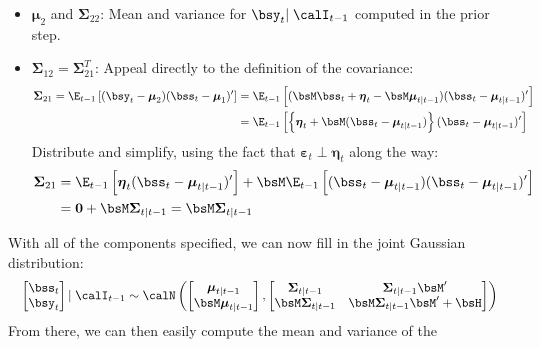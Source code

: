 \documentclass[12pt]{article}
\theoremstyle{plain}
\theoremstyle{definition}
\theoremstyle{remark}
\newcommand{\bseta}{\boldsymbol{\eta}}
\newcommand{\bsmu}{\boldsymbol{\mu}}
\newcommand{\bsSigma}{\boldsymbol{\Sigma}}
\newcommand{\bsvarepsilon}{\boldsymbol{\varepsilon}}
\renewcommand{\bso}{\boldsymbol{0}}
\begin{document}
\begin{enumerate}
\begin{itemize}
      \item $\bsmu_2$ and $\bsSigma_{22}$:
        Mean and variance for $\bsy_t |\; \calI_{t-1}$ computed in the
        prior step.

      \item $\bsSigma_{12} = \bsSigma_{21}^T$: Appeal directly to the
        definition of the covariance:
        \begin{align*}
          \bsSigma_{21}
          = \E_{t-1}\left[
              (\bsy_t-\bsmu_2)
              (\bss_t - \bsmu_1)'
              \right]
          &=
            \E_{t-1}\left[
              (\bsM\bss_t+\bseta_t-\bsM\bsmu_{t|t-1})
              (\bss_t-\bsmu_{t|t-1})'
            \right]  \\
          &= \E_{t-1}\left[
              \left\{\bseta_t+ \bsM(\bss_t-\bsmu_{t|t-1})\right\}
              (\bss_t-\bsmu_{t|t-1})'
            \right]
        \end{align*}
        Distribute and simplify, using the fact that
        $\bsvarepsilon_t\perp \bseta_t$ along the way:
        \begin{align*}
          \bsSigma_{21}
          &= \E_{t-1}\left[\bseta_t(\bss_t-\bsmu_{t|t-1})'\right]
            + \bsM\E_{t-1}\left[(\bss_t-\bsmu_{t|t-1})
                      (\bss_t-\bsmu_{t|t-1})'\right]
          \\
          &= \bso + \bsM\bsSigma_{t|t-1} = \bsM\bsSigma_{t|t-1}
        \end{align*}
    \end{itemize}
    With all of the components specified, we can now fill in the joint
    Gaussian distribution:
    \begin{alignat}{3}
      &&\begin{bmatrix} \bss_t \\ \bsy_t \end{bmatrix} | \;
      \calI_{t-1}
      &\sim
      \calN\left(\begin{bmatrix} \bsmu_{t|t-1} \\ \bsM\bsmu_{t|t-1}
        \end{bmatrix},
      \begin{bmatrix}
        \bsSigma_{t|t-1} & \bsSigma_{t|t-1} \bsM'
        \notag\\
        \bsM\bsSigma_{t|t-1} & \bsM\bsSigma_{t|t-1}\bsM' + \bsH
      \end{bmatrix}
      \right) \label{normfilt}
    \end{alignat}
    From there, we can then easily compute the mean and variance of the

\end{enumerate}
\end{document}
